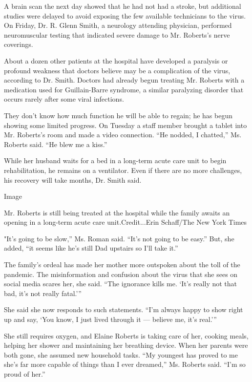 A brain scan the next day showed that he had not had a stroke, but
additional studies were delayed to avoid exposing the few available
technicians to the virus. On Friday, Dr. R. Glenn Smith, a neurology
attending physician, performed neuromuscular testing that indicated
severe damage to Mr. Roberts's nerve coverings.

About a dozen other patients at the hospital have developed a paralysis
or profound weakness that doctors believe may be a complication of the
virus, according to Dr. Smith. Doctors had already begun treating Mr.
Roberts with a medication used for Guillain-Barre syndrome, a similar
paralyzing disorder that occurs rarely after some viral infections.

They don't know how much function he will be able to regain; he has
begun showing some limited progress. On Tuesday a staff member brought a
tablet into Mr. Roberts's room and made a video connection. ``He nodded,
I chatted,'' Ms. Roberts said. ``He blew me a kiss.''

While her husband waits for a bed in a long-term acute care unit to
begin rehabilitation, he remains on a ventilator. Even if there are no
more challenges, his recovery will take months, Dr. Smith said.

Image

Mr. Roberts is still being treated at the hospital while the family
awaits an opening in a long-term acute care unit.Credit...Erin
Schaff/The New York Times

"It's going to be slow,'' Ms. Roman said. ``It's not going to be easy.''
But, she added, ``it seems like he's still Dad upstairs so I'll take
it.''

The family's ordeal has made her mother more outspoken about the toll of
the pandemic. The misinformation and confusion about the virus that she
sees on social media scares her, she said. ``The ignorance kills me.
`It's really not that bad, it's not really fatal.'''

She said she now responds to such statements. ``I'm always happy to show
right up and say, `You know, I just lived through it --- believe me,
it's real.'''

She still requires oxygen, and Elaine Roberts is taking care of her,
cooking meals, helping her shower and maintaining her breathing device.
When her parents were both gone, she assumed new household tasks. ``My
youngest has proved to me she's far more capable of things than I ever
dreamed,'' Ms. Roberts said. ``I'm so proud of her.''

